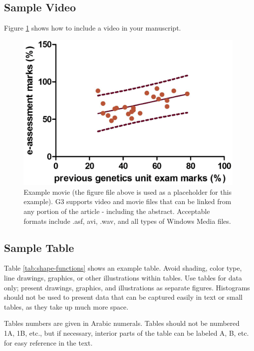 \documentclass[9pt,twocolumn,twoside]{g3_article/gsag3jnl}
\begin{document}
\subsection*{Sample Video}

Figure \ref{video:spectrum} shows how to include a video in your manuscript.

\begin{figure}[htbp]
\renewcommand{\familydefault}{\sfdefault}\normalfont
\centering
\includegraphics[width=\linewidth]{images/example-figure-g3}
\caption{Example movie (the figure file above is used as a placeholder for this example). G3 supports video and movie files that can be linked from any portion of the article - including the abstract. Acceptable formats include .asf, avi, .wav, and all types of Windows Media files.   
}%
\label{video:spectrum}
\end{figure}


\subsection*{Sample Table}

Table \ref{tab:shape-functions} shows an example table. Avoid shading, color type, line drawings, graphics, or other illustrations within tables. Use tables for data only; present drawings, graphics, and illustrations as separate figures. Histograms should not be used to present data that can be captured easily in text or small tables, as they take up much more space.  

Tables numbers are given in Arabic numerals. Tables should not be numbered 1A, 1B, etc., but if necessary, interior parts of the table can be labeled A, B, etc. for easy reference in the text.  
\end{document}
